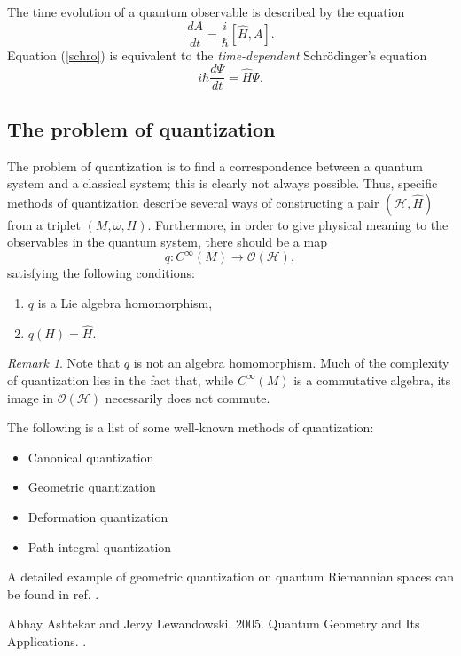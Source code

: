 \documentclass[12pt]{article}
\theoremstyle{definition}
\theoremstyle{remark}
\newtheorem*{rmk}{Remark}
\begin{document}
The time evolution of a quantum observable is described by the equation
\begin{equation}\label{schro}
\frac{dA}{dt} =  \frac{i}{\hbar} [\hat{H}, A].
\end{equation}
Equation (\ref{schro}) is equivalent to the \emph{time-dependent} Schr\"{o}dinger's equation
\begin{equation}
i \hbar \frac{d\Psi}{dt} = \hat{H} \Psi.
\end{equation}

\subsection*{The problem of quantization}

The problem of quantization is to find a correspondence between a quantum system and a classical system; this is clearly not always possible. Thus, specific methods of quantization describe several ways of constructing a pair $(\mathcal{H}, \hat{H})$ from a triplet $(M, \omega, H)$.  Furthermore, in order to give physical meaning to the observables in the quantum system, there should be a map
\begin{equation}
q\colon C^\infty(M) \to \mathcal{O}(\mathcal{H}),
\end{equation}
satisfying the following conditions:
\begin{enumerate}
\item $q$ is a Lie algebra homomorphism,
\item $q(H) = \hat{H}$.
\end{enumerate}

\begin{rmk} Note that $q$ is not an algebra homomorphism.  Much of the complexity of quantization lies in the fact that, while $C^\infty(M)$ is a commutative algebra, its image in $\mathcal{O}(\mathcal{H})$ necessarily does not commute.
\end{rmk}

The following is a list of some well-known methods of quantization:
\begin{itemize}
\item Canonical quantization
\item Geometric quantization
\item Deformation quantization
\item Path-integral quantization
\end{itemize}

A detailed example of geometric quantization on quantum Riemannian spaces can be found in 
ref. \cite{AL2k5}.

\begin{thebibliography}{9}
Abhay Ashtekar and Jerzy Lewandowski. 2005. Quantum Geometry and Its Applications.
.
\end{thebibliography}

\end{document}
